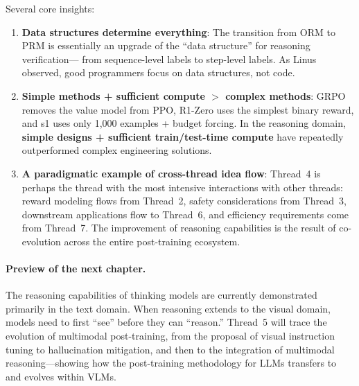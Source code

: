 \noindent
Several core insights:
\begin{enumerate}[leftmargin=2em]
  \item \textbf{Data structures determine everything}:
    The transition from ORM to PRM is essentially an upgrade of the ``data structure'' for reasoning verification---
    from sequence-level labels to step-level labels.
    As Linus observed, good programmers focus on data structures, not code.

  \item \textbf{Simple methods + sufficient compute $>$ complex methods}:
    GRPO removes the value model from PPO,
    R1-Zero uses the simplest binary reward,
    and s1 uses only 1,000 examples + budget forcing.
    In the reasoning domain, \textbf{simple designs + sufficient train/test-time compute}
    have repeatedly outperformed complex engineering solutions.

  \item \textbf{A paradigmatic example of cross-thread idea flow}:
    Thread~4 is perhaps the thread with the most intensive interactions with other threads:
    reward modeling flows from Thread~2, safety considerations from Thread~3,
    downstream applications flow to Thread~6, and efficiency requirements come from Thread~7.
    The improvement of reasoning capabilities is the result of co-evolution across the entire post-training ecosystem.
\end{enumerate}

\paragraph{Preview of the next chapter.}
The reasoning capabilities of thinking models are currently demonstrated primarily in the text domain.
When reasoning extends to the visual domain, models need to first ``see'' before they can ``reason.''
Thread~5 will trace the evolution of multimodal post-training,
from the proposal of visual instruction tuning to hallucination mitigation,
and then to the integration of multimodal reasoning---showing how the post-training methodology for LLMs transfers to and evolves within VLMs.
